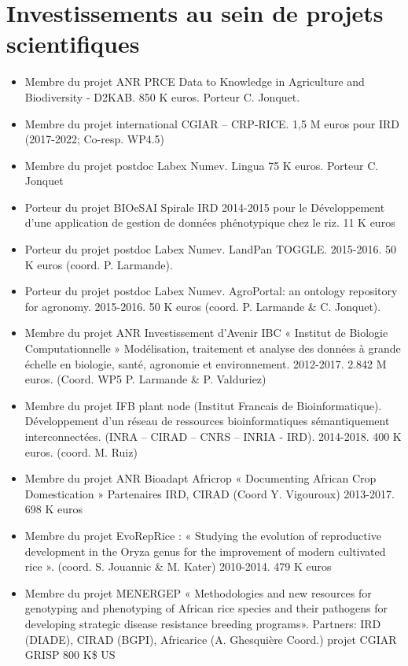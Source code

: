 \section{Investissements au sein de projets scientifiques}
\begin{itemize}
\item Membre du projet ANR PRCE Data to Knowledge in Agriculture and Biodiversity - D2KAB. 850 K euros. Porteur C. Jonquet.
\item Membre du projet international CGIAR – CRP-RICE. 1,5 M euros pour IRD (2017-2022; Co-resp. WP4.5)
\item Membre du projet postdoc Labex Numev. Lingua 75 K euros. Porteur C. Jonquet
\item Porteur du projet BIOeSAI Spirale IRD 2014-2015 pour le Développement d’une application de gestion de données phénotypique chez le riz. 11 K euros 
\item Porteur du projet postdoc Labex Numev. LandPan TOGGLE. 2015-2016. 50 K euros (coord. P. Larmande).

\item Porteur du projet postdoc Labex Numev. AgroPortal: an ontology repository for agronomy. 2015-2016. 50 K euros (coord. P. Larmande \& C. Jonquet).

\item Membre du projet ANR Investissement d’Avenir IBC « Institut de Biologie Computationnelle » Modélisation, traitement et analyse des données à grande échelle en biologie, santé, agronomie et environnement. 2012-2017. 2.842 M euros. (Coord. WP5 P. Larmande \& P. Valduriez)

\item Membre du projet IFB plant node  (Institut Francais de Bioinformatique).  Développement d’un réseau de ressources bioinformatiques sémantiquement interconnectées. (INRA – CIRAD – CNRS – INRIA  - IRD). 2014-2018. 400 K euros.  (coord. M. Ruiz) 

\item Membre du projet ANR Bioadapt Africrop  « Documenting African Crop Domestication » Partenaires IRD, CIRAD (Coord Y. Vigouroux) 2013-2017. 698 K euros
\item Membre du projet EvoRepRice : « Studying the evolution of reproductive development in the Oryza genus for the improvement of modern cultivated rice ». (coord.  S. Jouannic \& M. Kater) 2010-2014.  479 K euros
\item Membre du projet MENERGEP « Methodologies and new resources for genotyping and phenotyping of African rice species and their pathogens for developing strategic disease resistance breeding programs». Partners: IRD (DIADE), CIRAD (BGPI), Africarice (A. Ghesquière Coord.) projet CGIAR GRISP 800 K\$ US
\end{itemize}

